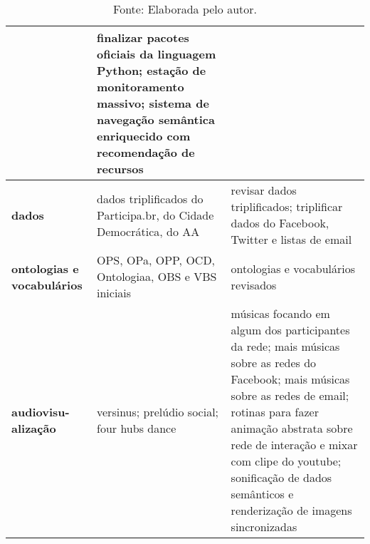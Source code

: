 \documentclass[a4paper,openright,12pt]{report} %
\newcommand{\source}[1]{\caption*{Fonte: {#1}} }
\begin{document}
\begin{table}[h]
\begin{tabular}{p{1.3cm}||p{7.6cm}|p{7.1cm}}
                       & finalizar pacotes oficiais da linguagem Python;
                       estação de monitoramento massivo;
                       sistema de navegação semântica enriquecido com recomendação de recursos
                       \\\hline
                       {\bf dados}        & dados triplificados do Participa.br, do Cidade Democrática, do AA  & revisar dados triplificados;
                       triplificar dados do Facebook, Twitter e listas de email \\\hline
                       {\bf ontologias e vocabulários}  & OPS, OPa, OPP, OCD, Ontologiaa, OBS e VBS iniciais  & ontologias e vocabulários revisados \\\hline
                       {\bf audiovisu-alização}         & versinus; prelúdio social; four hubs dance   & músicas focando em algum dos participantes da rede; mais músicas sobre as redes do Facebook; mais músicas sobre as redes de email; rotinas para fazer animação abstrata sobre rede de interação e mixar com clipe do youtube;
                       sonificação de dados semânticos e renderização de imagens sincronizadas \\\hline
\end{tabular}
\source{Elaborada pelo autor.}
\end{table}
\end{document}
